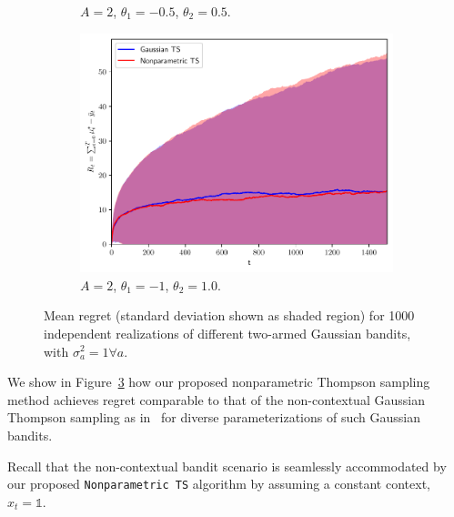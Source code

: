\begin{figure}[!h]
\begin{subfigure}[b]{0.32\textwidth}
		\vspace*{-5ex}
		\caption{$A=2$, $\theta_{1}=-0.5$, $\theta_{2}=0.5$.}
		\label{afig:static_gaussian_A2_05}
	\end{subfigure}
	\begin{subfigure}[b]{0.32\textwidth}
		\includegraphics[width=\textwidth]{./figs/staticGaussian/cumregret_A2_-1_1_1_1}
		\vspace*{-5ex}
		\caption{$A=2$, $\theta_{1}=-1$, $\theta_{2}=1.0$.}
		\label{afig:static_gaussian_A2_1}
	\end{subfigure}
	\vspace*{-2ex}
	\caption{Mean regret (standard deviation shown as shaded region) for 1000 independent realizations of different two-armed Gaussian bandits, with $\sigma_a^2=1 \forall a$.}
	\label{afig:static_gaussian_A2}
\end{figure}

We show in Figure~\ref{afig:static_gaussian_A2} how our proposed nonparametric Thompson sampling method achieves regret comparable to that of the non-contextual Gaussian Thompson sampling as in~\cite{ip-Agrawal2012} for diverse parameterizations of such Gaussian bandits.

Recall that the non-contextual bandit scenario is seamlessly accommodated by our proposed \texttt{Nonparametric TS} algorithm by assuming a constant context, \ie $x_t=\mathds{1}$.